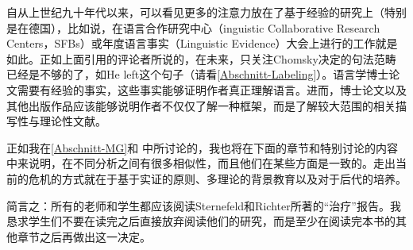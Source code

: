 {自从上世纪九十年代以来，可以看见更多的注意力放在了基于经验的研究上（特别是在德国），比如说，在语言合作研究中心（inguistic Collaborative Research Centers，SFBs）或年度语言事实（Linguistic Evidence）大会上进行的工作就是如此。正如上面引用的评论者所说的，在未来，只关注Chomsky决定的句法范畴已经是不够的了，如He left这个句子（请看\ref{Abschnitt-Labeling}）。语言学博士论文需要有经验的事实，这些事实能够证明作者真正理解语言。进而，博士论文以及其他出版作品应该能够说明作者不仅仅了解一种框架，而是了解较大范围的相关描写性与理论性文献。

正如我在\ref{Abschnitt-MG}和 中所讨论的，我也将在下面的章节和特别讨论的内容中来说明，在不同分析之间有很多相似性，而且他们在某些方面是一致的。走出当前的危机的方式就在于基于实证的原则、多理论的背景教育以及对于后代的培养。

简言之：所有的老师和学生都应该阅读Sternefeld和Richter所著的“治疗”报告。我恳求学生们不要在读完之后直接放弃阅读他们的研究，而是至少在阅读完本书的其他章节之后再做出这一决定。
}



